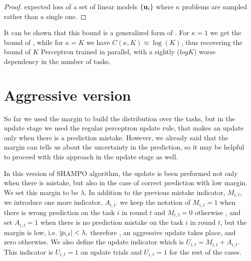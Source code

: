 {\begin{proof}
expected loss of a set of linear models $\{ \mathbf{u}_{i} \}$ where $\kappa$
problems are sampled rather than a single one.
\QED
%
\end{proof}
It can be shown that this bound  is a generalized form of . For $\kappa=1$ we get the bound of , while for
$\kappa=K$ we have $C(\kappa,K)\approx\log(K)$, thus recovering the
bound of $K$ Perceptron trained in parallel, with a sightly ($log K$)
worse dependency in the number of tasks.

\section{Aggressive version}

So far we used the margin to build the distribution over the tasks,  but in the update stage we used the regular perceptron update rule, that makes an update only when there is a prediction mistake. However, we already said that the margin can tells us about the uncertainty in the prediction, so it may be helpful to proceed with this approach in the update stage as well. 

In this  version of SHAMPO algorithm, the update is been preformed not only when there is mistake, but also in the case of correct prediction with low margin. We set this margin to be $\lambda$. In addition to the previous mistake indicator, $M_{i,t}$,  we introduce one more  indicator,   $A_{i,t}$. we keep the notation of  $M_{i,t}=1$ when there is wrong prediction on the task $i$ in round $t$ and $M_{i,t}=0$ otherwise ,  and set $A_{i,t}=1$ when there is no prediction mistake on the task $i$ in round $t$, but the margin is low, i.e. $\left\vert{p_{i,t}}\right\vert<\lambda,$ therefore , an aggressive update takes place, and zero otherwise. We  also define the update indicator which is $U_{i,t}=M_{i,t}+A_{i,t}$. This indicator is  $U_{i,t}=1$ on update trials and  $U_{i,t}=1$ for the rest of the cases.

}
